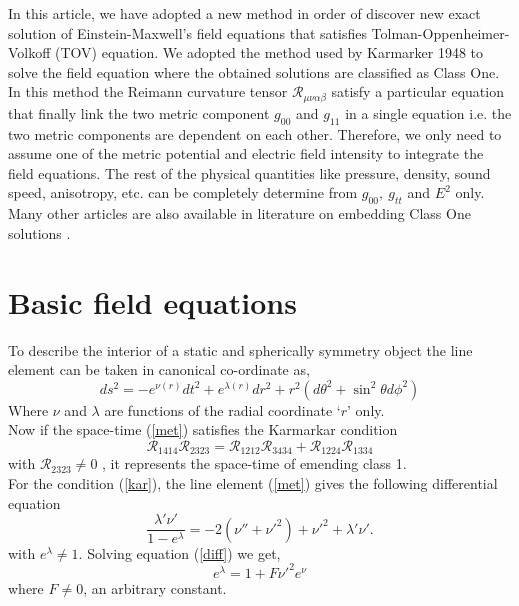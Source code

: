 \documentclass[preprintnumbers,amsmath,amssymb,floatfix,9pt,prd,twocolumn,
superscriptaddress,nofootinbib]{revtex4}
\begin{document}
In this article, we have adopted a new method in order of discover new exact solution of Einstein-Maxwell's field equations that satisfies Tolman-Oppenheimer-Volkoff (TOV) equation. We adopted the method used by Karmarker 1948 to solve the field equation where the obtained solutions are classified as Class One. In this method the Reimann curvature tensor $\mathcal{R}_{\mu \nu \alpha \beta}$ satisfy a particular equation that finally link the two metric component $g_{00}$ and $g_{11}$ in a single equation i.e. the two metric components are dependent on each other. Therefore, we only need to assume one of the metric potential and electric field intensity to integrate the field equations. The rest of the physical quantities like pressure, density, sound speed, anisotropy, etc. can be completely determine from $g_{00},~g_{tt}$ and $E^2$ only. Many other articles are also available in literature on embedding Class One solutions \cite{kn1,kn2,kn3,kn4,kn5,kn6,kn7,bhar4}.


\section{Basic field equations}
To describe the interior of a static and spherically symmetry object the line element can be taken in canonical co-ordinate as,
\begin{equation}
ds^{2}=-e^{\nu(r)}dt^{2}+e^{\lambda(r)}dr^{2}+r^{2}\left(d\theta^{2}+\sin^{2}\theta d\phi^{2} \right) \label{met}
\end{equation}
Where $\nu$ and $\lambda$ are functions of the radial coordinate `$r$' only.\\

Now if the space-time (\ref{met}) satisfies the Karmarkar condition \cite{kar}
\begin{equation}
\mathcal{R}_{1414}\mathcal{R}_{2323}=\mathcal{R}_{1212}\mathcal{R}_{3434}+ \mathcal{R}_{1224}\mathcal{R}_{1334} \label{kar}
\end{equation}
with $\mathcal{R}_{2323}\neq 0$ \cite{pandey}, it represents the space-time of emending class 1.\\

For the condition (\ref{kar}), the line element (\ref{met}) gives the following differential equation
\begin{equation}
\frac{\lambda'\nu'}{1-e^{\lambda}}=-2(\nu''+\nu'^{2})+\nu'^{2}+\lambda'\nu'. \label{diff}
\end{equation}
with $e^{\lambda}\neq 1.$ Solving equation (\ref{diff}) we get,
\begin{equation}
e^{\lambda}=1+F\nu'^{2}e^{\nu} \label{elam}
\end{equation}
where $F \neq 0$, an arbitrary constant.\\
\end{document}
